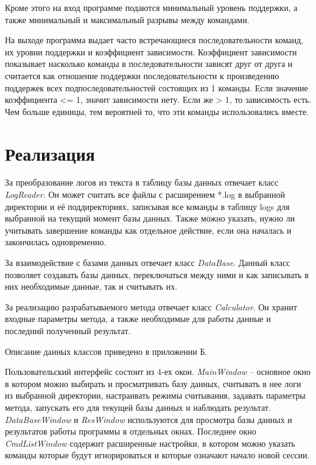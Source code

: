 Кроме этого на вход программе подаются минимальный уровень поддержки, а также минимальный и максимальный разрывы между командами.

На выходе программа выдает часто встречающиеся последовательности команд, их уровни поддержки и коэффициент зависимости.
Коэффициент зависимости показывает насколько команды в последовательности зависят друг от друга и считается как отношение поддержки последовательности к произведению поддержек всех подпоследовательностей состоящих из 1 команды. Если значение коэффициента <= 1, значит зависимости нету. Если же > 1, то зависимость есть. Чем больше единицы, тем вероятней то, что эти команды использовались вместе.

\section{Реализация}
За преобразование логов из текста в таблицу базы данных отвечает класс \textit{LogReader}.
Он может считать все файлы с расширением *.log в выбранной директории и её поддиректориях, записывая все команды в таблицу logs для выбранной на текущий момент базы данных. Также можно указать, нужно ли учитывать завершение команды как отдельное действие, если она началась и закончилась одновременно.

За взаимодействие с базами данных отвечает класс \textit{DataBase}.
Данный класс позволяет создавать базы данных,
переключаться между ними и как записывать в них необходимые данные, так и считывать их.

За реализацию разрабатываемого метода отвечает
класс \textit{Calculator}.
Он хранит входные параметры метода, а также необходимые для работы данные и последний полученный результат.

Описание данных классов приведено в приложении Б.


\newpage
Пользовательский интерфейс состоит из 4-ех окон. \textit{MainWindow} -- основное окно в котором можно выбирать и просматривать базу данных, считывать в нее логи из выбранной директории, настраивать режимы считывания, задавать параметры метода, запускать его для текущей базы данных и наблюдать результат. \textit{DataBaseWindow} и \textit{ResWindow} используются для просмотра базы данных и результатов работы программы в отдельных окнах. Последнее окно \textit{CmdListWindow} содержит расширенные настройки, в котором можно указать команды которые будут игнорироваться и которые означают начало новой сессии.

